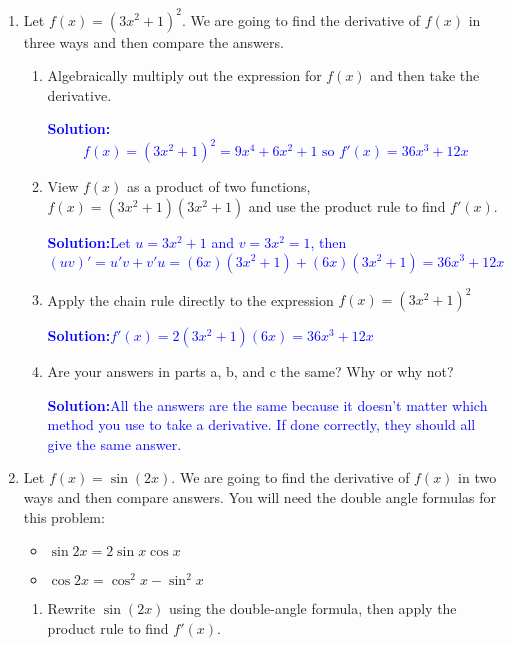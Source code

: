 \documentclass[letterpaper,11pt]{article}
\newcommand{\sol}[2]{\begin{minipage}[c][#1]{\linewidth}{\textcolor{blue}{\textbf{Solution:}}\quad \textcolor{blue}{#2}}\end{minipage}}
\newcommand{\sol}[2]{\begin{minipage}[c][#1]{\linewidth}{\vfill}\end{minipage}}
\begin{document}

\begin{enumerate}

\item Let $f(x)=(3x^2+1)^2$. We are going to find the derivative of $f(x)$ in three ways and then compare the answers.

\begin{enumerate}
\item Algebraically multiply out the expression for $f(x)$ and then take the derivative.

\sol{1.5in}{\[f(x)=(3x^2+1)^2=9x^4+6x^2+1 \text{ so } f'(x)=36x^3+12x\]}

\item View $f(x)$ as a product of two functions, $f(x)=(3x^2+1)(3x^2+1)$ and use the product rule to find $f'(x)$.

\sol{1.5 in}{Let $u=3x^2+1$ and $v=3x^2=1$, then $(uv)'=u'v+v'u=(6x)(3x^2+1)+(6x)(3x^2+1)=36x^3+12x$}

\item Apply the chain rule directly to the expression $f(x)=(3x^2+1)^2$

\sol{1.5 in}{$f'(x)=2(3x^2+1)(6x)=36x^3+12x$}

\item Are your answers in parts a, b, and c the same? Why or why not?

\sol{1.5 in}{All the answers are the same because it doesn't matter which method you use to take a derivative. If done correctly, they should all give the same answer.}

\end{enumerate}

\newpage

\item Let $f(x)=\sin(2x).$ We are going to find the derivative of $f(x)$ in two ways and then compare answers.  You will need the double angle formulas for this problem:
\begin{itemize}
\item $\sin{2x}=2\sin{x}\cos{x}$
\item $\cos{2x}=\cos^2{x}-\sin^2{x}$

\end{itemize}

\begin{enumerate}
\item Rewrite $\sin(2x)$ using the double-angle formula, then apply the product rule to find $f'(x)$.


\end{enumerate}
\end{enumerate}
\end{document}
